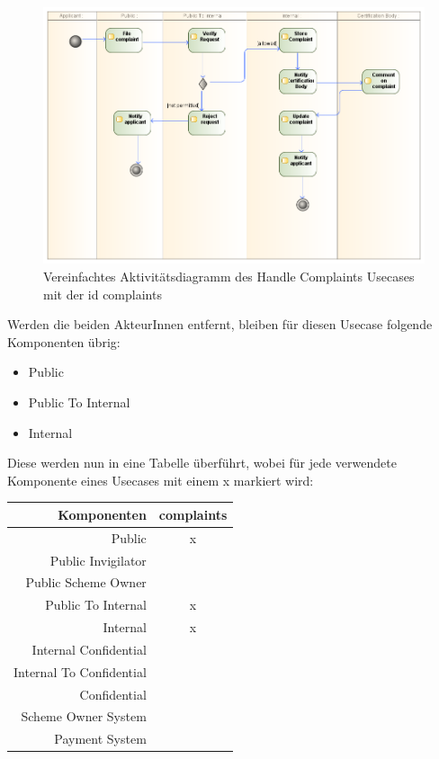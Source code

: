 \begin{figure}[H]
    \centering
    \includegraphics[scale=0.5]{uml/handlecomplaintsactivityreview.png}
    \caption{Vereinfachtes Aktivitätsdiagramm des Handle Complaints Usecases mit der id complaints}
    \label{fig:handlecomplaintreview}
\end{figure}

Werden die beiden AkteurInnen entfernt, bleiben für diesen Usecase folgende Komponenten übrig:

\begin{itemize}
  \item Public
  \item Public To Internal
  \item Internal
\end{itemize}

Diese werden nun in eine Tabelle überführt, wobei für jede verwendete Komponente eines Usecases mit einem x markiert wird:

\hfill \break

\begin{tabular}{ | r | c | }
    \hline
    Komponenten & complaints \\
    \hline
    Public & x \\
    \hline
    Public Invigilator & \\
    \hline
    Public Scheme Owner & \\
    \hline
    Public To Internal & x \\
    \hline
    Internal & x \\
    \hline
    Internal Confidential & \\
    \hline
    Internal To Confidential & \\
    \hline
    Confidential & \\
    \hline
    Scheme Owner System & \\
    \hline
    Payment System & \\
    \hline
\end{tabular}

